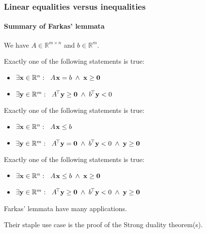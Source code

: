\documentclass{beamer}
\renewcommand{\.}{\hskip .75pt}
\DeclareMathOperator{\aand}{~\wedge~}
\begin{document}
\begin{frame}
	\frametitle{Linear equalities versus inequalities}
	\framesubtitle{Summary of Farkas' lemmata}
	
	We have $A \in \mathbb{R}^{m \times n}$ and $b \in \mathbb{R}^{m}$.
	\smallskip
	
	Exactly one of the following statements is true:\vspace{-1mm}
	\begin{itemize} \color{dblue}
		\item $\exists \bold{x} \in \mathbb{R}^{n} : \ \; A\. \bold{x} = b \aand \bold{x} \ge \bold{0}$
		\item $\exists \bold{y} \in \mathbb{R}^{m} : \ \; A^{\!\top} \bold{y} \ge \bold{0} \aand b^{\!\top} \bold{y} < 0$
	\end{itemize}
		
	Exactly one of the following statements is true:\vspace{-1mm}
	\begin{itemize} \color{dblue}
		\item $\exists \bold{x} \in \mathbb{R}^{n} : \ \; A\. \bold{x} \le b$
		\item $\exists \bold{y} \in \mathbb{R}^{m} : \ \; A^{\!\top} \bold{y} = \bold{0} \aand b^{\!\top} \bold{y} < 0 \aand \bold{y} \ge \bold{0}$
	\end{itemize}

	Exactly one of the following statements is true:\vspace{-1mm}
	\begin{itemize} \color{dblue}
		\item $\exists \bold{x} \in \mathbb{R}^{n} : \ \; A\. \bold{x} \le b \aand \bold{x} \ge \bold{0}$
		\item $\exists \bold{y} \in \mathbb{R}^{m} : \ \; A^{\!\top} \bold{y} \ge \bold{0} \aand b^{\!\top} \bold{y} < 0 \aand \bold{y} \ge \bold{0}$
	\end{itemize}
	\smallskip

	Farkas' lemmata have many applications.
	
	Their staple use case is the proof of the Strong duality theorem(s).
	
\end{frame}
\end{document}
